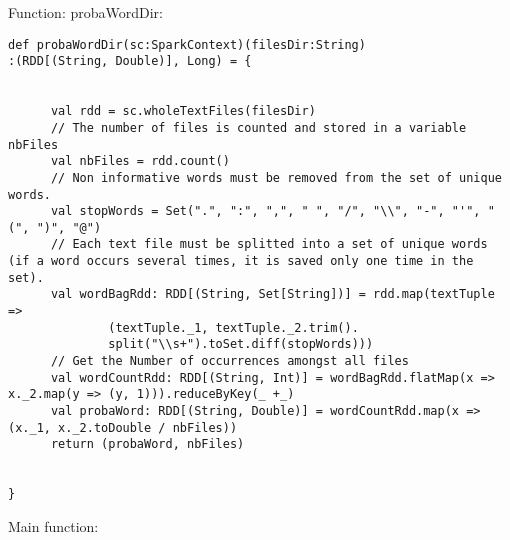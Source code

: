 \documentclass[paper=a4, fontsize=11pt]{scrartcl}
\numberwithin{equation}{section}		%
\numberwithin{figure}{section}			%
\numberwithin{table}{section}				%
\begin{document}
Function: probaWordDir:
\begin{lstlisting}
def probaWordDir(sc:SparkContext)(filesDir:String)
:(RDD[(String, Double)], Long) = {


      val rdd = sc.wholeTextFiles(filesDir)
      // The number of files is counted and stored in a variable nbFiles
      val nbFiles = rdd.count()
      // Non informative words must be removed from the set of unique words.
      val stopWords = Set(".", ":", ",", " ", "/", "\\", "-", "'", "(", ")", "@")
      // Each text file must be splitted into a set of unique words (if a word occurs several times, it is saved only one time in the set).
      val wordBagRdd: RDD[(String, Set[String])] = rdd.map(textTuple =>
              (textTuple._1, textTuple._2.trim().
              split("\\s+").toSet.diff(stopWords)))
      // Get the Number of occurrences amongst all files
      val wordCountRdd: RDD[(String, Int)] = wordBagRdd.flatMap(x => x._2.map(y => (y, 1))).reduceByKey(_ +_)
      val probaWord: RDD[(String, Double)] = wordCountRdd.map(x => (x._1, x._2.toDouble / nbFiles))
      return (probaWord, nbFiles)


}
\end{lstlisting}
Main function:
\end{document}
